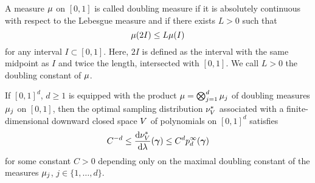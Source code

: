 \begin{definition}
	A measure $\mu$ on $[0,1]$ is called doubling measure if it is absolutely continuous with respect to the Lebesgue measure and if there exists $L>0$ such that
	\begin{equation*}
	\mu(2I)\leq L\mu(I)
	\end{equation*}
	for any interval $I\subset [0,1]$. Here, $2I$ is defined as the interval with the same midpoint as $I$ and twice the length, intersected with $[0,1]$. We call $L>0$ the doubling constant of $\mu$.
\end{definition}
\begin{pro}
	\label{pro:sampling}
	If $[0,1]^d$, $d\geq 1$ is equipped with the product $\mu=\bigotimes_{j=1}^{d}\mu_j$  of doubling measures $\mu_j$ on $[0,1]$, then the optimal sampling distribution $
	\nu^{*}_{V}$  associated with a finite-dimensional downward closed space $V$ of polynomials on $[0,1]^d$ satisfies
	\begin{equation}
	\label{eq:samplingbounds}
	C^{-d}\leq \frac{\text{\textup{d}}\nu^{*}_{V}}{\text{\textup{d}}\lambda}(\bm{\gamma})\leq C^dp^{\infty}_{d}(\bm{\gamma})
	\end{equation}
	for some constant $C>0$ depending only on the maximal doubling constant of the measures $\mu_j$, $j\in\{1,\dots,d\}$.
\end{pro}

